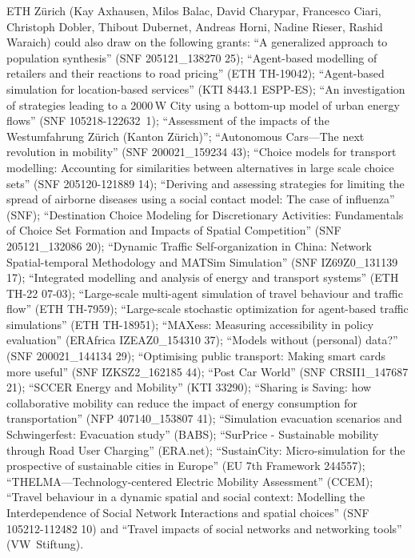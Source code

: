 ETH Zürich (Kay Axhausen, Milos Balac, David Charypar, Francesco Ciari, Christoph Dobler, Thibout Dubernet, Andreas Horni, Nadine Rieser, Rashid Waraich) could also draw on the following grants: 
``A generalized approach to population synthesis'' (SNF 205121\_138270 25); 
``Agent-based modelling of retailers and their reactions to road pricing'' (ETH TH-19042); 
``Agent-based simulation for location-based services'' (KTI 8443.1 ESPP-ES); 
``An investigation of strategies leading to a 2000\,W City using a bottom-up model of urban energy flows'' (SNF 105218-122632~1); 
``Assessment of the impacts of the Westumfahrung Zürich (Kanton Zürich)''; 
``Autonomous Cars---The next revolution in mobility'' (SNF 200021\_159234 43); 
``Choice models for transport modelling: Accounting for similarities between alternatives in large scale choice sets'' (SNF 205120-121889 14); 
``Deriving and assessing strategies for limiting the spread of airborne diseases using a social contact model: The case of influenza'' (SNF); 
``Destination Choice Modeling for Discretionary Activities: Fundamentals of Choice Set Formation and Impacts of Spatial Competition'' (SNF 205121\_132086 20); 
``Dynamic Traffic Self-organization in China: Network Spatial-temporal Methodology and MATSim Simulation'' (SNF IZ69Z0\_131139 17); 
``Integrated modelling and analysis of energy and transport systems'' (ETH TH-22 07-03); 
``Large-scale multi-agent simulation of travel behaviour and traffic flow'' (ETH TH-7959); 
``Large-scale stochastic optimization for agent-based traffic simulations'' (ETH TH-18951); 
``MAXess: Measuring accessibility in policy evaluation'' (ERAfrica IZEAZ0\_154310 37); 
``Models without (personal) data?'' (SNF 200021\_144134 29); 
``Optimising public transport: Making smart cards more useful'' (SNF IZKSZ2\_162185 44); 
``Post Car World'' (SNF CRSII1\_147687 21); 
``SCCER Energy and Mobility'' (KTI 33290); 
``Sharing is Saving: how collaborative mobility can reduce the impact of energy consumption for transportation'' (NFP 407140\_153807 41); 
``Simulation evacuation scenarios and Schwingerfest: Evacuation study'' (BABS); 
``SurPrice - Sustainable mobility through Road User Charging'' (ERA.net); 
``SustainCity: Micro-simulation for the prospective of sustainable cities in Europe'' (EU 7th Framework 244557); 
``THELMA---Technology-centered Electric Mobility Assessment'' (CCEM); 
``Travel behaviour in a dynamic spatial and social context: Modelling the Interdependence of Social Network Interactions and spatial choices'' (SNF 105212-112482 10) and 
``Travel impacts of social networks and networking tools'' (VW~Stiftung).

